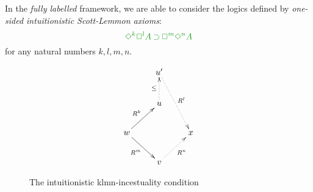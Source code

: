 %
%
%
%

In the \emph{fully labelled} framework, we are able to consider the logics defined by \emph{one-sided intuitionistic Scott-Lemmon axioms}:
\begin{equation}
\fm{\DIA^{k} \BOX^{l} A \IMP \BOX^{m}\DIA^{n} A}
\end{equation}
for any natural numbers $k,l,m,n$.

\begin{figure}
	$$
	\xymatrix{
		& u' \ar@{.>}[ddr]^{R^l} \\
		& u \ar@{.>}[u]^{\le} \\
		w \ar@{->}[ur]^{R^k}\ar@{->}[dr]_{R^m} && x \\
		& v \ar@{.>}[ur]_{R^n}
	}
	$$
	\caption{The intuitionistic klmn-incestuality condition}
	\label{fig:gklmn}
\end{figure}


